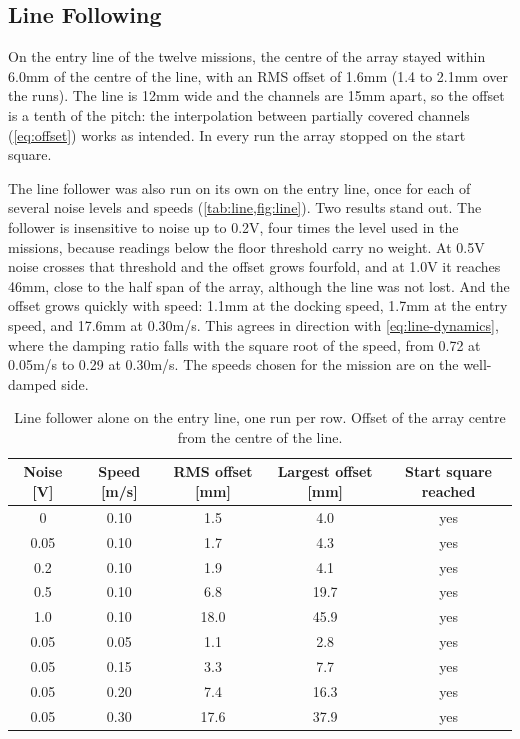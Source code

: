 \subsection{Line Following}
\label{sec:res-line}
On the entry line of the twelve missions, the centre of the array stayed within 6.0\unit{mm}
of the centre of the line, with an RMS offset of 1.6\unit{mm} (1.4 to 2.1\unit{mm} over the
runs). The line is 12\unit{mm} wide and the channels are 15\unit{mm} apart, so the offset is
a tenth of the pitch: the interpolation between partially covered channels
(\cref{eq:offset}) works as intended. In every run the array stopped on the start square.

The line follower was also run on its own on the entry line, once for each of several noise
levels and speeds (\cref{tab:line,fig:line}). Two results stand out. The follower is
insensitive to noise up to 0.2\unit{V}, four times the level used in the missions, because
readings below the floor threshold carry no weight. At 0.5\unit{V} noise crosses that
threshold and the offset grows fourfold, and at 1.0\unit{V} it reaches 46\unit{mm}, close
to the half span of the array, although the line was not lost. And the offset grows quickly
with speed: 1.1\unit{mm} at the docking speed, 1.7\unit{mm} at the entry speed, and
17.6\unit{mm} at 0.30\unit{m/s}. This agrees in direction with \cref{eq:line-dynamics},
where the damping ratio falls with the square root of the speed, from 0.72 at
0.05\unit{m/s} to 0.29 at 0.30\unit{m/s}. The speeds chosen for the mission are on the
well-damped side.

\begin{table}[htbp]
  \centering
  \caption{Line follower alone on the entry line, one run per row. Offset of the array
  centre from the centre of the line.}
  \label{tab:line}
  \begin{tabular}{@{}ccccc@{}}
    \toprule
    Noise [V] & Speed [m/s] & RMS offset [mm] & Largest offset [mm] & Start square reached \\
    \midrule
    0 & 0.10 & 1.5 & 4.0 & yes \\
    0.05 & 0.10 & 1.7 & 4.3 & yes \\
    0.2 & 0.10 & 1.9 & 4.1 & yes \\
    0.5 & 0.10 & 6.8 & 19.7 & yes \\
    1.0 & 0.10 & 18.0 & 45.9 & yes \\
    \midrule
    0.05 & 0.05 & 1.1 & 2.8 & yes \\
    0.05 & 0.15 & 3.3 & 7.7 & yes \\
    0.05 & 0.20 & 7.4 & 16.3 & yes \\
    0.05 & 0.30 & 17.6 & 37.9 & yes \\
    \bottomrule
  \end{tabular}
\end{table}

